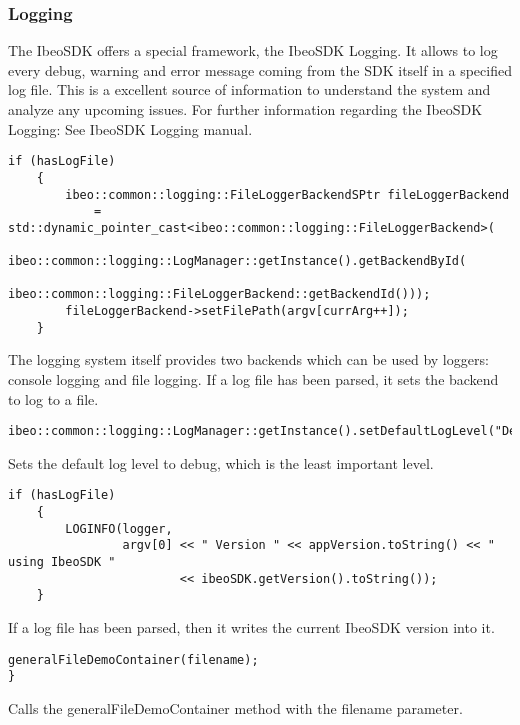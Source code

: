 \subsubsection{Logging}
The IbeoSDK offers a special framework, the IbeoSDK Logging. It allows to log every debug, warning and error message coming from the SDK itself in a specified log file. This is a excellent source of information to understand the system and analyze any upcoming issues. For further information regarding the IbeoSDK Logging: See IbeoSDK Logging manual.
\begin{lstlisting}[firstnumber=last]
    if (hasLogFile)
    {
    	ibeo::common::logging::FileLoggerBackendSPtr fileLoggerBackend
    		= std::dynamic_pointer_cast<ibeo::common::logging::FileLoggerBackend>(
    			ibeo::common::logging::LogManager::getInstance().getBackendById(
    				ibeo::common::logging::FileLoggerBackend::getBackendId()));
    	fileLoggerBackend->setFilePath(argv[currArg++]);
    }
\end{lstlisting}
The logging system itself provides two backends which can be used by loggers: console logging and file logging. If a log file has been parsed, it sets the backend to log to a file.
\begin{lstlisting}[firstnumber=last]
    ibeo::common::logging::LogManager::getInstance().setDefaultLogLevel("Debug");
\end{lstlisting}
Sets the default log level to debug, which is the least important level.
\begin{lstlisting}[firstnumber=last]
    if (hasLogFile)
    {
    	LOGINFO(logger,
    			argv[0] << " Version " << appVersion.toString() << "  using IbeoSDK "
    					<< ibeoSDK.getVersion().toString());
    }
\end{lstlisting}
If a log file has been parsed, then it writes the current IbeoSDK version into it. 
\begin{lstlisting}[firstnumber=last]
	generalFileDemoContainer(filename);
}
\end{lstlisting}
Calls the generalFileDemoContainer method with the filename parameter.
